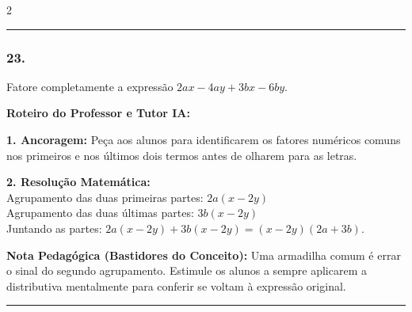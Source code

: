 \begin{multicols*}{2}
\par\vspace{\espacoQuestao}

\noindent\textcolor{CorLinha}{\rule{\linewidth}{0.5pt}} 
\par\vspace{\espacoPreQuestao}
\subsubsection*{23.} 
\begin{enunciadoLiteral}
Fatore completamente a expressão $2ax - 4ay + 3bx - 6by$.
\end{enunciadoLiteral}

\ifgabarito
    \begin{tcolorbox}[colback=CorTitUm!5, colframe=CorTitUm, boxrule=1pt, arc=4pt, left=6pt, right=6pt, top=6pt, bottom=6pt]
    \small\textbf{\textcolor{CorTitUm}{Roteiro do Professor e Tutor IA:}}\par\vspace{0.1cm}
    \color{CinzaEscuro}
    \textbf{1. Ancoragem:} Peça aos alunos para identificarem os fatores numéricos comuns nos primeiros e nos últimos dois termos antes de olharem para as letras.\par\vspace{0.1cm}
    \textbf{2. Resolução Matemática:}\\
    Agrupamento das duas primeiras partes: $2a(x - 2y)$\\
    Agrupamento das duas últimas partes: $3b(x - 2y)$\\
    Juntando as partes: $2a(x - 2y) + 3b(x - 2y) = (x - 2y)(2a + 3b)$.
    \end{tcolorbox}
    \vspace{0.15cm}
    
    \begin{boxexplicacao}
    \textbf{Nota Pedagógica (Bastidores do Conceito):} Uma armadilha comum é errar o sinal do segundo agrupamento. Estimule os alunos a sempre aplicarem a distributiva mentalmente para conferir se voltam à expressão original.
    \end{boxexplicacao}
\fi

\par\vspace{\espacoQuestao}

\noindent\textcolor{CorLinha}{\rule{\linewidth}{0.5pt}} 
\par\vspace{\espacoPreQuestao}

\end{multicols*}
